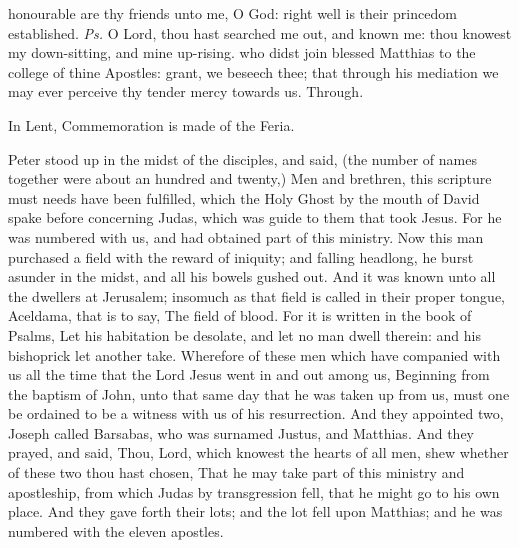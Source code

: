 \introit
{} honourable are thy friends unto me, O God: right well is their princedom established. \textit{Ps.} O Lord, thou hast searched me out, and known me: thou knowest my down-sitting, and mine up-rising.
\collect
 who didst join blessed Matthias to the college of thine Apostles: grant, we beseech thee; that through his mediation we may ever perceive thy tender mercy towards us. Through.
\begin{rubric}
    In Lent, Commemoration is made of the Feria.%
\end{rubric}
 Peter stood up in the midst of the disciples, and said, (the number of names together were about an hundred and twenty,) Men and brethren, this scripture must needs have been fulfilled, which the Holy Ghost by the mouth of David spake before concerning Judas, which was guide to them that took Jesus. For he was numbered with us, and had obtained part of this ministry. Now this man purchased a field with the reward of iniquity; and falling headlong, he burst asunder in the midst, and all his bowels gushed out. And it was known unto all the dwellers at Jerusalem; insomuch as that field is called in their proper tongue, Aceldama, that is to say, The field of blood. For it is written in the book of Psalms, Let his habitation be desolate, and let no man dwell therein: and his bishoprick let another take. Wherefore of these men which have companied with us all the time that the Lord Jesus went in and out among us, Beginning from the baptism of John, unto that same day that he was taken up from us, must one be ordained to be a witness with us of his resurrection. And they appointed two, Joseph called Barsabas, who was surnamed Justus, and Matthias. And they prayed, and said, Thou, Lord, which knowest the hearts of all men, shew whether of these two thou hast chosen, That he may take part of this ministry and apostleship, from which Judas by transgression fell, that he might go to his own place. And they gave forth their lots; and the lot fell upon Matthias; and he was numbered with the eleven apostles.

